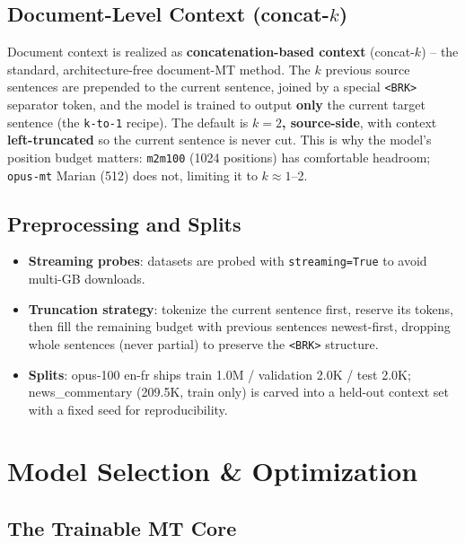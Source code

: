 \documentclass[12pt,a4paper]{article}
\begin{document}
\subsection{Document-Level Context (concat-$k$)}

Document context is realized as \textbf{concatenation-based context} (concat-$k$) -- the standard, architecture-free document-MT method. The $k$ previous source sentences are prepended to the current sentence, joined by a special \texttt{<BRK>} separator token, and the model is trained to output \textbf{only} the current target sentence (the \texttt{k-to-1} recipe). The default is \textbf{$k=2$, source-side}, with context \textbf{left-truncated} so the current sentence is never cut. This is why the model's position budget matters: \texttt{m2m100} (1024 positions) has comfortable headroom; \texttt{opus-mt} Marian (512) does not, limiting it to $k\approx1$--2.

\subsection{Preprocessing and Splits}

\begin{itemize}
  \item \textbf{Streaming probes}: datasets are probed with \texttt{streaming=True} to avoid multi-GB downloads.
  \item \textbf{Truncation strategy}: tokenize the current sentence first, reserve its tokens, then fill the remaining budget with previous sentences newest-first, dropping whole sentences (never partial) to preserve the \texttt{<BRK>} structure.
  \item \textbf{Splits}: opus-100 en-fr ships train 1.0M / validation 2.0K / test 2.0K; news\_commentary (209.5K, train only) is carved into a held-out context set with a fixed seed for reproducibility.
\end{itemize}

\section{Model Selection \& Optimization}

\subsection{The Trainable MT Core}
\end{document}
